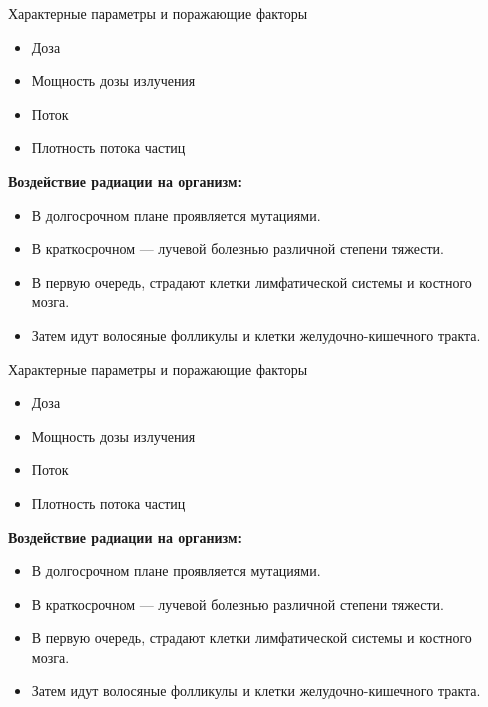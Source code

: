 \documentclass[unicode,lefteqn,c,hyperref={pdfpagelabels=false}]{beamer}
\begin{document}
\begin{frame}{Характерные параметры и поражающие факторы}
    \begin{itemize}
        \item Доза
        \item Мощность дозы излучения
        \item Поток
        \item Плотность потока частиц
    \end{itemize}
    \smallskip

    \textbf{Воздействие радиации на организм:}
    \begin{itemize}
        \item В долгосрочном плане проявляется мутациями.
        \item В краткосрочном --- лучевой болезнью различной степени тяжести.
        \item В первую очередь, страдают клетки лимфатической системы и костного мозга.
        \item Затем идут волосяные фолликулы и клетки желудочно-кишечного тракта.
    \end{itemize}
\end{frame}


\begin{frame}{Характерные параметры и поражающие факторы}
    \begin{itemize}
        \item Доза
        \item Мощность дозы излучения
        \item Поток
        \item Плотность потока частиц
    \end{itemize}
    \smallskip

    \textbf{Воздействие радиации на организм:}
    \begin{itemize}
        \item В долгосрочном плане проявляется мутациями.
        \item В краткосрочном --- лучевой болезнью различной степени тяжести.
        \item В первую очередь, страдают клетки лимфатической системы и костного мозга.
        \item Затем идут волосяные фолликулы и клетки желудочно-кишечного тракта.
    \end{itemize}
\end{frame}
\end{document}
